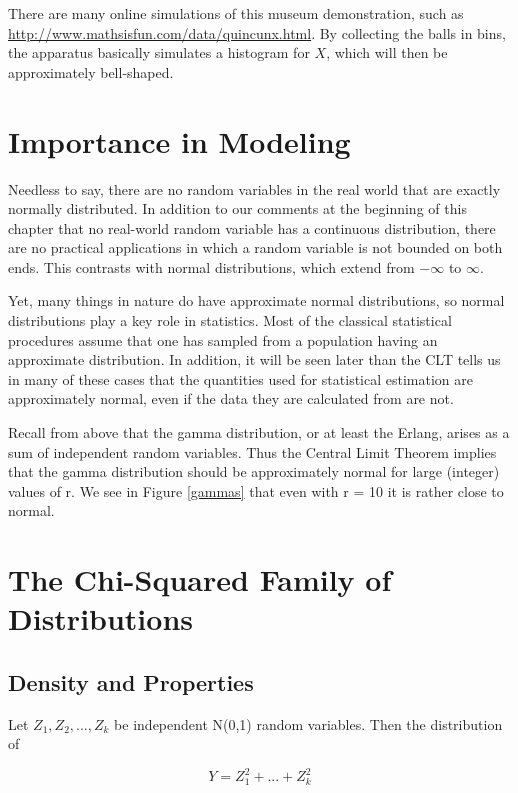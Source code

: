 There are many online simulations of this museum demonstration, such as
\url{http://www.mathsisfun.com/data/quincunx.html}.  By collecting the
balls in bins, the apparatus basically simulates a histogram for $X$,
which will then be approximately bell-shaped.

\section{Importance in Modeling}
\label{normalimp}

Needless to say, there are no random variables in the real world that
are exactly normally distributed.  In addition to our comments at the
beginning of this chapter that no real-world random variable has a
continuous distribution, there are no practical applications in which a
random variable is not bounded on both ends.  This contrasts with normal
distributions, which extend from $-\infty$ to $\infty$.

Yet, many things in nature do have approximate normal distributions, so
normal distributions play a key role in statistics.  Most of the
classical statistical procedures assume that one has sampled from a
population having an approximate distribution.  In addition, it will be
seen later than the CLT tells us in many of these cases that the
quantities used for statistical estimation are approximately normal,
even if the data they are calculated from are not.

Recall from above that the gamma distribution, or at least the Erlang,
arises as a sum of independent random variables.  Thus the Central Limit
Theorem implies that the gamma distribution should be approximately
normal for large (integer) values of r.  We see in Figure \ref{gammas}
that even with r = 10 it is rather close to normal.

\section{The Chi-Squared Family of Distributions}
\label{chisqfam}

\subsection{Density and Properties}

Let $Z_1, Z_2,..., Z_k$ be independent N(0,1) random variables.  Then
the distribution of 

\begin{equation}
\label{sumz2}
Y = Z_1^2+...+Z_k^2
\end{equation}

